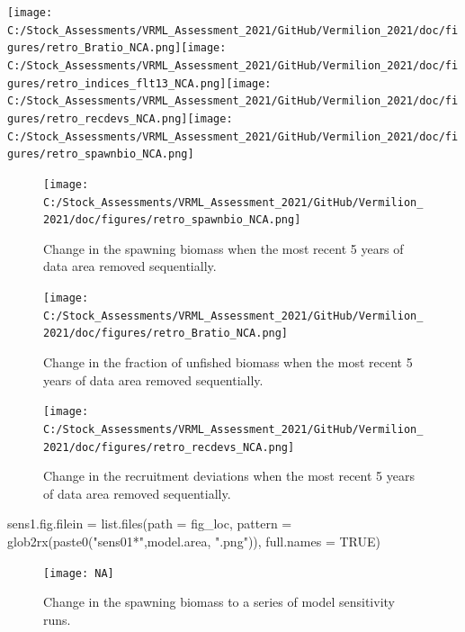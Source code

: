 \documentclass[
  english,
  a4paper,
]{article}
\newenvironment{Shaded}{\begin{snugshade}}{\end{snugshade}}
\newcommand{\AttributeTok}[1]{\textcolor[rgb]{0.77,0.63,0.00}{#1}}
\newcommand{\ConstantTok}[1]{\textcolor[rgb]{0.00,0.00,0.00}{#1}}
\newcommand{\FunctionTok}[1]{\textcolor[rgb]{0.00,0.00,0.00}{#1}}
\newcommand{\NormalTok}[1]{#1}
\newcommand{\OtherTok}[1]{\textcolor[rgb]{0.56,0.35,0.01}{#1}}
\newcommand{\StringTok}[1]{\textcolor[rgb]{0.31,0.60,0.02}{#1}}
\begin{document}
\texttt{[image: C:/Stock\_Assessments/VRML\_Assessment\_2021/GitHub/Vermilion\_2021/doc/figures/retro\_Bratio\_NCA.png]}\texttt{[image: C:/Stock\_Assessments/VRML\_Assessment\_2021/GitHub/Vermilion\_2021/doc/figures/retro\_indices\_flt13\_NCA.png]}\texttt{[image: C:/Stock\_Assessments/VRML\_Assessment\_2021/GitHub/Vermilion\_2021/doc/figures/retro\_recdevs\_NCA.png]}\texttt{[image: C:/Stock\_Assessments/VRML\_Assessment\_2021/GitHub/Vermilion\_2021/doc/figures/retro\_spawnbio\_NCA.png]}

\begin{figure}
\centering
\texttt{[image: C:/Stock\_Assessments/VRML\_Assessment\_2021/GitHub/Vermilion\_2021/doc/figures/retro\_spawnbio\_NCA.png]}
\caption{Change in the spawning biomass when the most recent 5 years of data area removed sequentially.\label{fig:retro-spawnb}}
\end{figure}

\begin{figure}
\centering
\texttt{[image: C:/Stock\_Assessments/VRML\_Assessment\_2021/GitHub/Vermilion\_2021/doc/figures/retro\_Bratio\_NCA.png]}
\caption{Change in the fraction of unfished biomass when the most recent 5 years of data area removed sequentially.\label{fig:retro-bratio}}
\end{figure}

\begin{figure}
\centering
\texttt{[image: C:/Stock\_Assessments/VRML\_Assessment\_2021/GitHub/Vermilion\_2021/doc/figures/retro\_recdevs\_NCA.png]}
\caption{Change in the recruitment deviations when the most recent 5 years of data area removed sequentially.\label{fig:retro-recdev}}
\end{figure}

\begin{Shaded}
\begin{Highlighting}[]
\NormalTok{sens1.fig.filein }\OtherTok{=} \FunctionTok{list.files}\NormalTok{(}\AttributeTok{path =}\NormalTok{ fig\_loc,  }
                  \AttributeTok{pattern =} \FunctionTok{glob2rx}\NormalTok{(}\FunctionTok{paste0}\NormalTok{(}\StringTok{"sens01*"}\NormalTok{,model.area, }\StringTok{".png"}\NormalTok{)), }
                  \AttributeTok{full.names =} \ConstantTok{TRUE}\NormalTok{)}
\end{Highlighting}
\end{Shaded}

\begin{figure}
\centering
\texttt{[image: NA]}
\caption{Change in the spawning biomass to a series of model sensitivity runs.\label{fig:sens1-spawnb}}
\end{figure}
\end{document}
